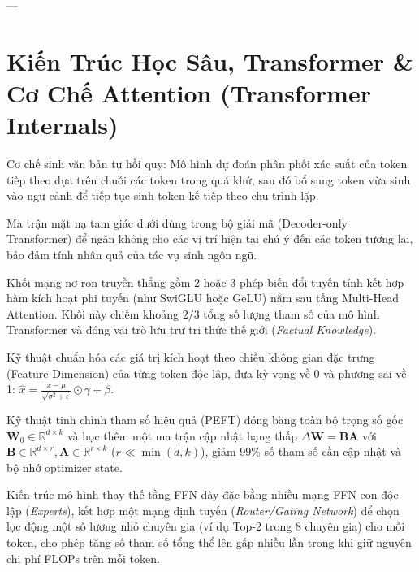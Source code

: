 ---

\section{Kiến Trúc Học Sâu, Transformer \& Cơ Chế Attention (Transformer Internals)}
\label{sec:app-glossary-transformer}

\begin{description}[leftmargin=2.5cm, style=nextline]
  \item[\term{Autoregressive Generation}] Cơ chế sinh văn bản tự hồi quy: Mô hình dự đoán phân phối xác suất của token tiếp theo dựa trên chuỗi các token trong quá khứ, sau đó bổ sung token vừa sinh vào ngữ cảnh để tiếp tục sinh token kế tiếp theo chu trình lặp.

  \item[\term{Causal Attention Mask}] Ma trận mặt nạ tam giác dưới dùng trong bộ giải mã (Decoder-only Transformer) để ngăn không cho các vị trí hiện tại chú ý đến các token tương lai, bảo đảm tính nhân quả của tác vụ sinh ngôn ngữ.

  \item[\term{Feed-Forward Network (FFN/MLP)}] Khối mạng nơ-ron truyền thẳng gồm 2 hoặc 3 phép biến đổi tuyến tính kết hợp hàm kích hoạt phi tuyến (như SwiGLU hoặc GeLU) nằm sau tầng Multi-Head Attention. Khối này chiếm khoảng $2/3$ tổng số lượng tham số của mô hình Transformer và đóng vai trò lưu trữ tri thức thế giới (\textit{Factual Knowledge}).

  \item[\term{Layer Normalization (LayerNorm)}] Kỹ thuật chuẩn hóa các giá trị kích hoạt theo chiều không gian đặc trưng (Feature Dimension) của từng token độc lập, đưa kỳ vọng về 0 và phương sai về 1: $\hat{x} = \frac{x - \mu}{\sqrt{\sigma^2 + \epsilon}} \odot \gamma + \beta$.

  \item[\term{LoRA (Low-Rank Adaptation)}] Kỹ thuật tinh chỉnh tham số hiệu quả (PEFT) đóng băng toàn bộ trọng số gốc $\mathbf{W}_0 \in \mathbb{R}^{d \times k}$ và học thêm một ma trận cập nhật hạng thấp $\Delta \mathbf{W} = \mathbf{B}\mathbf{A}$ với $\mathbf{B} \in \mathbb{R}^{d \times r}, \mathbf{A} \in \mathbb{R}^{r \times k}$ ($r \ll \min(d, k)$), giảm $99\%$ số tham số cần cập nhật và bộ nhớ optimizer state.

  \item[\term{Mixture of Experts (MoE)}] Kiến trúc mô hình thay thế tầng FFN dày đặc bằng nhiều mạng FFN con độc lập (\textit{Experts}), kết hợp một mạng định tuyến (\textit{Router/Gating Network}) để chọn lọc động một số lượng nhỏ chuyên gia (ví dụ Top-2 trong 8 chuyên gia) cho mỗi token, cho phép tăng số tham số tổng thể lên gấp nhiều lần trong khi giữ nguyên chi phí FLOPs trên mỗi token.


\end{description}
